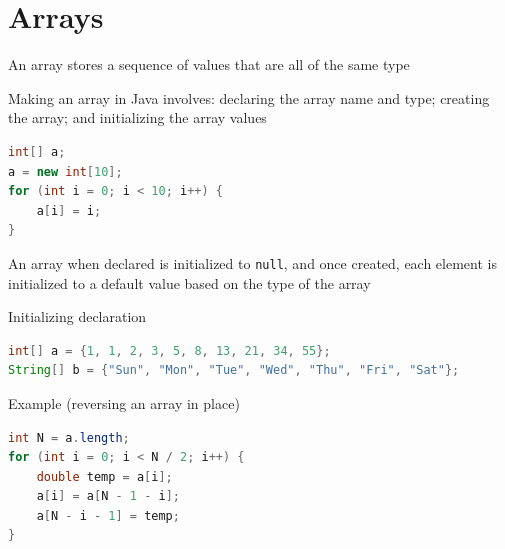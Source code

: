 \documentclass[8pt,a4paper,compress]{beamer}
\begin{document}
\section{Arrays}
\begin{frame}[fragile]
\pause

An array stores a sequence of values that are all of the same type 

\pause\bigskip

Making an array in Java involves: declaring the array name and type; creating the array; and initializing the array values

\smallskip

\begin{lstlisting}[language=Java,style=focusin]
int[] a;
a = new int[10];
for (int i = 0; i < 10; i++) {
    a[i] = i;
}
\end{lstlisting}

\pause\bigskip

An array when declared is initialized to \lstinline{null}, and once created, each element is initialized to a default value based on the type of the array

\pause\bigskip

Initializing declaration

\smallskip

\begin{lstlisting}[language=Java,style=focusin]
int[] a = {1, 1, 2, 3, 5, 8, 13, 21, 34, 55};
String[] b = {"Sun", "Mon", "Tue", "Wed", "Thu", "Fri", "Sat"};
\end{lstlisting}

\pause\bigskip

Example (reversing an array in place)

\smallskip

\begin{lstlisting}[language=Java,style=focusin]
int N = a.length;
for (int i = 0; i < N / 2; i++) {
    double temp = a[i];
    a[i] = a[N - 1 - i];
    a[N - i - 1] = temp;
}
\end{lstlisting}
\end{frame}
\end{document}

